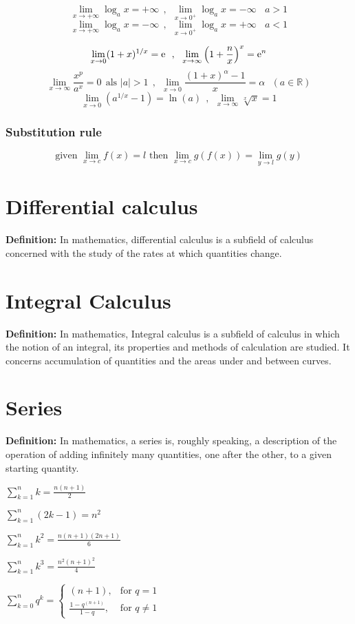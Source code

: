 \[
\lim_{x\rightarrow+\infty}\log_ax=+\infty ~~,~~ \lim_{x\rightarrow0^+}\log_ax=-\infty ~~~~ a>1
\]
\[
\lim_{x\rightarrow+\infty}\log_ax=-\infty ~~,~~ \lim_{x\rightarrow0^+}\log_ax=+\infty ~~~~ a<1
\]

\[
\lim_{x\rightarrow0}(1+x)^{1/x}={\rm e}~~,~~
\lim_{x\rightarrow\infty}\left(1+\frac{n}{x}\right)^x={\rm e}^n
\]
\[
\lim_{x\rightarrow\infty}\frac{x^p}{a^x}=0~~\mbox{als }|a|>1 ~~,~~
\lim_{x\rightarrow0}\frac{(1+x)^\alpha-1}{x}=\alpha ~~~ (a\in\mathbb{R})
\]
\[
\lim_{x\rightarrow0}\left(a^{1/x}-1\right)=\ln(a)~~,~~
\lim_{x\rightarrow\infty}\sqrt[x]{x}=1
\]

\subsubsection{Substitution rule}
\[
\text{given  } \lim_{x\rightarrow c}f(x)=l \text{   then   } \lim_{x\rightarrow c}g(f(x))=\lim_{y\rightarrow l}g(y) 
\]

\section{Differential calculus}
\textbf{Definition:} In mathematics, differential calculus is a subfield of calculus concerned with the study of the rates at which quantities change.





\section{Integral Calculus}
\textbf{Definition:} In mathematics, Integral calculus is a subfield of calculus in which the notion of an integral, its properties and methods of calculation are studied. It concerns accumulation of quantities and the areas under and between curves.





\section{Series}	
\textbf{Definition:} In mathematics, a series is, roughly speaking, a description of the operation of adding infinitely many quantities, one after the other, to a given starting quantity.



\begin{multicols}{3}
	
$ \sum_{k=1}^n k = \frac{n(n+1)}{2} $

$ \sum_{k=1}^n (2k-1) = n^2 $

$ \sum_{k=1}^n k^2 = \frac{n(n+1)(2n+1)}{6} $

$ \sum_{k=1}^n k^3 = \frac{n^2(n+1)^2}{4} $

$
\sum_{k=0}^{n}q^k = \begin{cases}
                         (n+1), & \text{for } q=1\\
                         \frac{1-q^{(n+1)}}{1-q}, & \text{for } q\neq1
                    \end{cases}
$
	
\end{multicols}
